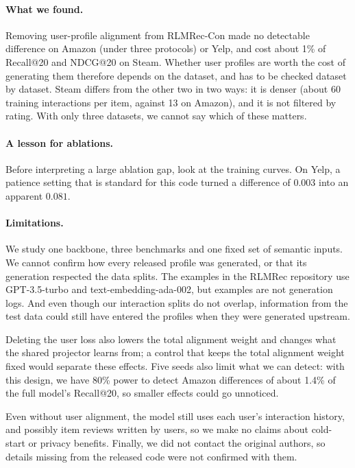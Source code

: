 \documentclass[runningheads]{llncs}
\begin{document}
\paragraph{What we found.}
Removing user-profile alignment from RLMRec-Con made no detectable difference
on Amazon (under three protocols) or Yelp, and cost about 1\% of Recall@20 and
NDCG@20 on Steam. Whether user profiles are worth the cost of generating them
therefore depends on the dataset, and has to be checked dataset by dataset.
Steam differs from the other two in two ways: it is denser (about 60 training
interactions per item, against 13 on Amazon), and it is not filtered by
rating. With only three datasets, we cannot say which of these matters.

\paragraph{A lesson for ablations.}
Before interpreting a large ablation gap, look at the training curves. On
Yelp, a patience setting that is standard for this code turned a difference
of $0.003$ into an apparent $0.081$.

\paragraph{Limitations.}
We study one backbone, three benchmarks and one fixed set of semantic inputs.
We cannot confirm how every released profile was generated, or that its
generation respected the data splits. The examples in the RLMRec repository
use GPT-3.5-turbo and text-embedding-ada-002, but examples are not generation
logs. And even though our interaction splits do not overlap, information from
the test data could still have entered the profiles when they were generated
upstream.

Deleting the user loss also lowers the total alignment weight and changes what
the shared projector learns from; a control that keeps the total alignment
weight fixed would separate these effects. Five seeds also limit what we can
detect: with this design, we have 80\% power to detect Amazon differences of
about 1.4\% of the full model's Recall@20, so smaller effects could go
unnoticed.

Even without user alignment, the model still uses each user's interaction
history, and possibly item reviews written by users, so we make no claims
about cold-start or privacy benefits. Finally, we did not contact the original
authors, so details missing from the released code were not confirmed with
them.
\end{document}
